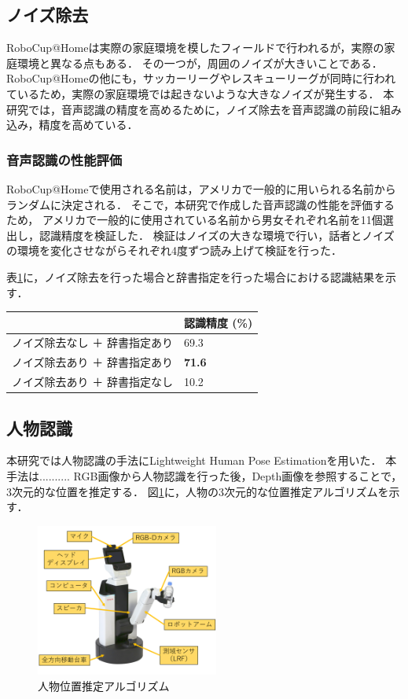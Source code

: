 \documentclass[a4j]{jarticle}
\begin{document}
\subsection{ノイズ除去}
RoboCup@Homeは実際の家庭環境を模したフィールドで行われるが，実際の家庭環境と異なる点もある．
その一つが，周囲のノイズが大きいことである．
RoboCup@Homeの他にも，サッカーリーグやレスキューリーグが同時に行われているため，実際の家庭環境では起きないような大きなノイズが発生する．
本研究では，音声認識の精度を高めるために，ノイズ除去\cite{sainburg2020finding}を音声認識の前段に組み込み，精度を高めている．

\subsubsection{音声認識の性能評価}
RoboCup@Homeで使用される名前は，アメリカで一般的に用いられる名前からランダムに決定される．
そこで，本研究で作成した音声認識の性能を評価するため，
アメリカで一般的に使用されている名前から男女それぞれ名前を11個選出し，認識精度を検証した．
検証はノイズの大きな環境で行い，話者とノイズの環境を変化させながらそれぞれ4度ずつ読み上げて検証を行った．

表\ref{voice_recognition_result}に，ノイズ除去を行った場合と辞書指定を行った場合における認識結果を示す．
\begin{table}
\centering
\begin{tabular}{|l|l|}
\hline
                 & 認識精度 (\%)      \\
\hline
ノイズ除去なし ＋ 辞書指定あり & 69.3           \\
\hline
ノイズ除去あり ＋ 辞書指定あり & \textbf{71.6}  \\
\hline
ノイズ除去あり ＋ 辞書指定なし & 10.2           \\
\hline
\end{tabular}
\label{voice_recognition_result}
\end{table}



\subsection{人物認識}
本研究では人物認識の手法にLightweight Human Pose Estimation\cite{light-openpose}を用いた．
本手法は..........
RGB画像から人物認識を行った後，Depth画像を参照することで，3次元的な位置を推定する．
図\ref{human_estimation_explain}に，人物の3次元的な位置推定アルゴリズムを示す．
\begin{figure}[ht]
  \centering
  \includegraphics[width=6cm]{images/hsr/hsr_explain_ja.png}
  \caption{人物位置推定アルゴリズム}
  \label{human_estimation_explain}
\end{figure}
\end{document}
